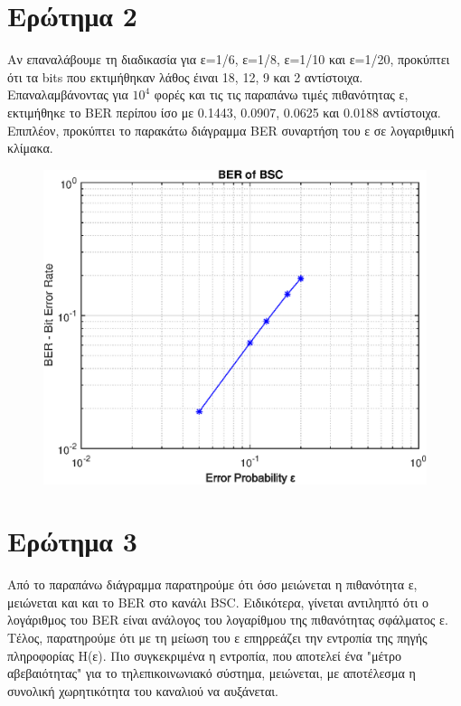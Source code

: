 \documentclass{article}
\begin{document}
\section{Eρώτημα 2}
Aν επαναλάβουμε τη διαδικασία για ε=1/6, ε=1/8, ε=1/10 και ε=1/20, προκύπτει ότι τα bits που εκτιμήθηκαν λάθος έιναι 18, 12, 9 και 2 αντίστοιχα. Επαναλαμβάνοντας για $10^4$ φορές και τις τις παραπάνω τιμές πιθανότητας ε, εκτιμήθηκε το BER περίπου ίσο με 0.1443, 0.0907, 0.0625 και 0.0188 αντίστοιχα. Επιπλέον, προκύπτει το παρακάτω διάγραμμα BER συναρτήση του ε σε λογαριθμική κλίμακα. 
\begin{figure}[h]
	\centering
	\includegraphics[width=0.6\linewidth]{./results/lab4eps.eps}
\end{figure}

\section{Eρώτημα 3}
Aπό το παραπάνω διάγραμμα παρατηρούμε ότι όσο μειώνεται η πιθανότητα ε, μειώνεται και και το BER στο κανάλι BSC. Ειδικότερα, γίνεται αντιληπτό ότι ο λογάριθμος του BER είναι ανάλογος του λογαρίθμου της πιθανότητας σφάλματος ε.\\
Τέλος, παρατηρούμε ότι με τη μείωση του ε επηρρεάζει την εντροπία της πηγής πληροφορίας H(ε). Πιο συγκεκριμένα η εντροπία, που αποτελεί ένα "μέτρο αβεβαιότητας" για το τηλεπικοινωνιακό σύστημα, μειώνεται, με αποτέλεσμα η συνολική χωρητικότητα του καναλιού να αυξάνεται.
\end{document}
